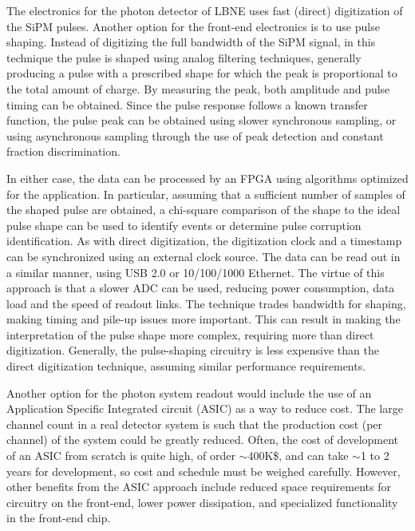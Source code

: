 
The electronics for the photon detector of LBNE uses fast (direct)
digitization of the SiPM pulses. Another option for the front-end
electronics is to use pulse shaping. Instead of digitizing the full
bandwidth of the SiPM signal, in this technique the pulse is shaped using analog
filtering techniques, generally producing a pulse with a prescribed
shape for which the peak is proportional to the total amount of charge.
By measuring the peak, both amplitude and pulse timing can be
obtained.  Since the pulse response follows a known transfer function,
the pulse peak can be obtained using slower synchronous sampling, or
using asynchronous sampling through the use of peak detection and
constant fraction discrimination.  

In either case, the data can be processed by an FPGA using algorithms
optimized for the application.  In particular, assuming that a
sufficient number of samples of the shaped pulse are obtained, a
chi-square comparison of the shape to the ideal pulse shape can be
used to identify events or determine pulse corruption identification.
As with direct digitization, the digitization clock and a timestamp
can be synchronized using an external clock source. The data can be
read out in a similar manner, using USB 2.0 or 10/100/1000 Ethernet.
The virtue of this approach is that a slower ADC can be used, reducing
power consumption, data load and the speed of readout links. The
technique trades bandwidth for shaping, making timing and pile-up
issues more important.  This can result in making the interpretation
of the pulse shape more complex, requiring more than direct
digitization.  Generally, the pulse-shaping circuitry is less
expensive than the direct digitization technique, assuming similar
performance requirements.

Another option for the photon system readout would include the use of
an Application Specific Integrated circuit (ASIC) as a way to reduce
cost.  The large channel count in a real detector system is such that
the production cost (per channel) of the system could be greatly
reduced. Often, the cost of development of an ASIC from scratch is
quite high, of order $\sim$400K\$, and can take $\sim$1 to 2 years for
development, so cost and schedule must be weighed carefully.  However,
other benefits from the ASIC approach include reduced space
requirements for circuitry on the front-end, lower power dissipation,
and specialized functionality in the front-end chip.

